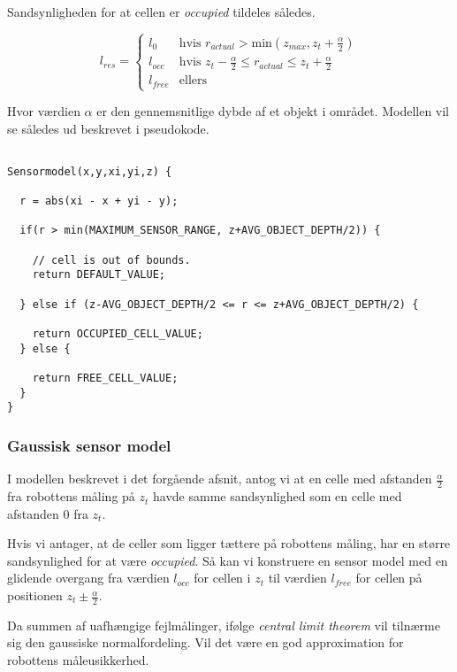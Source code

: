 Sandsynligheden for at cellen er  \emph{occupied} tildeles således.

$$l_{res} = \begin{cases} 
	l_0 &\text{hvis }r_{actual} > \text{min}(z_{max},z_t+\frac{\alpha}{2}) \\ 
	l_{occ} &\text{hvis } z_t-\frac{\alpha}{2} \leq r_{actual} \leq z_t+\frac{\alpha}{2}\\ 
	l_{free} &\text{ellers}  
\end{cases}$$

Hvor værdien $\alpha$ er den gennemsnitlige dybde af et objekt i området.
Modellen vil se således ud beskrevet i pseudokode.

\begin{lstlisting}[style=c, caption={Basal Sensor Model}, breaklines=true]

Sensormodel(x,y,xi,yi,z) {

  r = abs(xi - x + yi - y);  
  
  if(r > min(MAXIMUM_SENSOR_RANGE, z+AVG_OBJECT_DEPTH/2)) {
  
    // cell is out of bounds.
    return DEFAULT_VALUE;
    
  } else if (z-AVG_OBJECT_DEPTH/2 <= r <= z+AVG_OBJECT_DEPTH/2) {

    return OCCUPIED_CELL_VALUE;
  } else {    
    
  	return FREE_CELL_VALUE;
  }
}
\end{lstlisting}

\subsubsection{Gaussisk sensor model}

I modellen beskrevet i det forgående afsnit, antog vi at en celle
med afstanden $\frac{\alpha}{2}$ fra robottens måling på $z_t$ havde
samme sandsynlighed som en celle med afstanden 0 fra $z_t$.

Hvis vi antager, at de celler som ligger tættere på robottens måling,
har en større sandsynlighed for at være \emph{occupied}. 
Så kan vi konstruere en sensor model med en glidende overgang fra værdien $l_{occ}$ for 
cellen i $z_t$ til værdien $l_{free}$ for cellen på positionen $z_t \pm \frac{\alpha}{2}$. 

Da summen af uafhængige fejlmålinger, ifølge \emph{central limit theorem} vil tilnærme sig
den gaussiske normalfordeling. \cite[p. 223]{ArtificialIntelligence}
Vil det være en god approximation for robottens måleusikkerhed.


